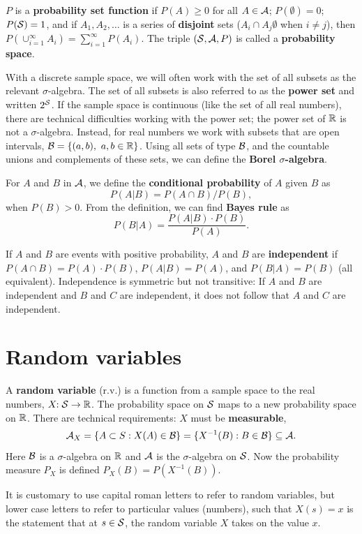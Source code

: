 \documentclass[twoside]{article}
\begin{document}
$P$ is a \textbf{probability set function} if $P(A)\geq0$ for all $A\in\mathcal{A}$; $P(\emptyset)=0$; $P(\mathcal{S})=1$,
and if $A_1,A_2,\dots$ is a series of \textbf{disjoint} sets ($A_i\cap A_j\emptyset$ when $i\neq j$), then
$P(\cup_{i=1}^\infty A_i)=\sum_{i=1}^\infty P(A_i)$. 
The triple $(\mathcal{S},\mathcal{A},P)$ is called a \textbf{probability space}.

With a discrete sample space, we will often work with the set of all subsets as the relevant 
$\sigma$-algebra. The set of all subsets is also referred to as the \textbf{power set} and written $2^{\mathcal{S}}$.
If the sample space is continuous (like the set of all real numbers), there are technical difficulties
working with the power set; the power set of $\mathbb{R}$ is not a $\sigma$-algebra. Instead, for real numbers 
we work with subsets that are open intervals, $\mathcal{B} = \{(a,b), \ a,b\in\mathbb{R}\}$. Using all sets of type $\mathcal{B}$,
and the countable unions and complements of these sets, we can define the \textbf{Borel $\sigma$-algebra}.

For $A$ and $B$ in $\mathcal{A}$, we define the \textbf{conditional probability} of $A$ given $B$
as \[ P(A|B) = P(A\cap B)/P(B),\] when $P(B)>0$. From the definition, we can find 
\textbf{Bayes rule}
as 
\[ P(B|A) = \frac{ P(A|B)\cdot P(B)}{P(A)}.\]

If $A$ and $B$ are events with positive probability, $A$ and $B$ are \textbf{independent} if
$P(A\cap B) = P(A)\cdot P(B)$, $P(A|B)=P(A)$, and $P(B|A)=P(B)$ (all equivalent). Independence
is symmetric but not transitive: If $A$ and $B$ are independent and $B$ and $C$ are independent,
it does not follow that $A$ and $C$ are independent.

\section{Random variables}

A \textbf{random variable}  (r.v.) is a function from a sample space to the real numbers,
$X\!\!: \mathcal{S} \rightarrow \mathbb{R}$. The probability space on $\mathcal{S}$ maps to a new
probability space on $\mathbb{R}$. There are technical requirements:
$X$ must be \textbf{measurable},
\[ \mathcal{A}_X = \{A\subset S: X(A) \in \mathcal{B}\} = \{X^{-1}(B): B\in \mathcal{B}\}\subseteq \mathcal{A}.\]
Here $\mathcal{B}$ is a $\sigma$-algebra on $\mathbb{R}$ and $\mathcal{A}$ is the $\sigma$-algebra on $\mathcal{S}$.
Now the probability measure $P_X$ is defined $P_X(B) = P(X^{-1}(B))$.

It is customary to use capital roman letters to refer to random variables, but
lower case letters to refer to particular values (numbers), such that $X(s)=x$
is the statement that at $s\in\mathcal{S}$, the random variable $X$ takes on the value $x$.
\end{document}
